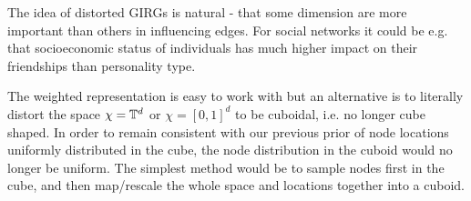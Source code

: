 The idea of distorted GIRGs is natural - that some dimension are more important than others in influencing edges. For social networks it could be e.g. that socioeconomic status of individuals has much higher impact on their friendships than personality type.

The weighted representation is easy to work with but an alternative is to literally distort the space $\chi = \mathbb{T}^d$ or $\chi = [0,1]^d$ to be cuboidal, i.e. no longer cube shaped. In order to remain consistent with our previous prior of node locations uniformly distributed in the cube, the node distribution in the cuboid would no longer be uniform. The simplest method would be to sample nodes first in the cube, and then map/rescale the whole space and locations together into a cuboid.









